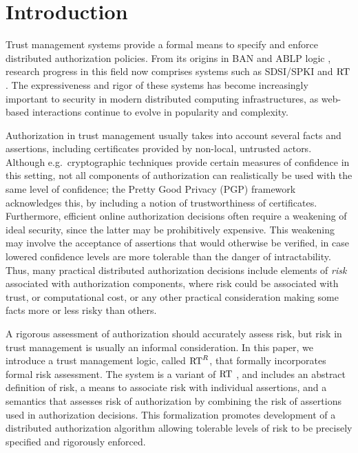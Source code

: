 \section{Introduction}

Trust management systems provide a formal means to specify and enforce
distributed authorization policies.  From its origins in BAN
\cite{BAN} and ABLP logic \cite{ABLP93}, research progress in this
field now comprises systems such as SDSI/SPKI
\cite{rivest-lampson-96,ellison-etal-rfc99} and $\text{RT}$
\cite{Li:2003-04}.  The expressiveness and rigor of these systems has
become increasingly important to security in modern distributed
computing infrastructures, as web-based interactions continue to 
evolve in popularity and complexity.

Authorization in trust management usually takes into account several
facts and assertions, including certificates provided by non-local,
untrusted actors.  Although e.g.~cryptographic techniques provide
certain measures of confidence in this setting, not all components of
authorization can realistically be used with the same level of
confidence; the Pretty Good Privacy (PGP) framework acknowledges this,
by including a notion of trustworthiness of certificates.
Furthermore, efficient online authorization decisions often require a
weakening of ideal security, since the latter may be prohibitively
expensive.  This weakening may involve the acceptance of assertions
that would otherwise be verified, in case lowered confidence levels are
more tolerable than the danger of intractability.  Thus, many
practical distributed authorization decisions include elements of
\emph{risk} associated with authorization components, where risk could
be associated with trust, or computational cost, or any other
practical consideration making some facts more or less risky than
others.

A rigorous assessment of authorization should accurately assess risk,
but risk in trust management is usually an informal consideration.  In
this paper, we introduce a trust management logic, called $\text{RT}^R$, that
formally incorporates formal risk assessment.  The system is a variant
of $\text{RT}$ \cite{Li:2003-04}, and includes an abstract definition of
risk, a means to associate risk with individual assertions, and a
semantics that assesses risk of authorization by combining the risk of
assertions used in authorization decisions.  This formalization
promotes development of a distributed authorization algorithm allowing
tolerable levels of risk to be precisely specified and rigorously
enforced.

